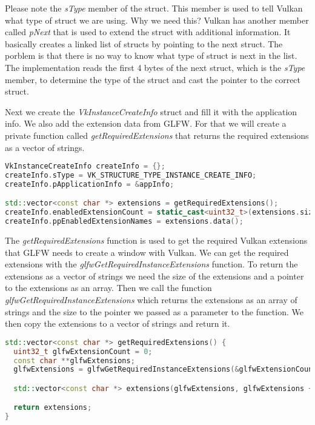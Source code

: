 \documentclass[12pt]{report} \usepackage{preamble}
\begin{document}
Please note the \textit{sType} member of the struct. This member is used to tell Vulkan
what type of struct we are using. Why we need this? Vulkan has another member called
\textit{pNext} that is used to extend the struct with additional information. It basically
creates a linked list of structs by pointing to the next struct. The porblem is that there is
no way to know what type of struct is next in the list. The implementation reads the first 4 bytes
of the next struct, which is the \textit{sType} member, to determine the type of the struct and
cast the pointer to the correct struct.

Next we create the \textit{VkInstanceCreateInfo} struct and fill it with the application info.
We also add the extension data from GLFW.
For that we will create a private function called \textit{getRequiredExtensions} that returns
the required extensions as a vector of strings.

\begin{lstlisting}[language=C++]
VkInstanceCreateInfo createInfo = {};
createInfo.sType = VK_STRUCTURE_TYPE_INSTANCE_CREATE_INFO;
createInfo.pApplicationInfo = &appInfo;

std::vector<const char *> extensions = getRequiredExtensions();
createInfo.enabledExtensionCount = static_cast<uint32_t>(extensions.size());
createInfo.ppEnabledExtensionNames = extensions.data();
\end{lstlisting}

The \textit{getRequiredExtensions} function is used to get the required Vulkan extensions
that GLFW needs to create a window with Vulkan. We can get the required extensions with the
\textit{glfwGetRequiredInstanceExtensions} function. To return the extensions as a vector of strings
we need the size of the extensions and a pointer to the extensions as an array. Then we call the function
\textit{glfwGetRequiredInstanceExtensions} which returns the extensions as an array of strings and the size
to the pointer we passed as a parameter to the function. We then copy the extensions to a vector of strings
and return it.

\begin{lstlisting}[language=C++]
std::vector<const char *> getRequiredExtensions() {
  uint32_t glfwExtensionCount = 0;
  const char **glfwExtensions;
  glfwExtensions = glfwGetRequiredInstanceExtensions(&glfwExtensionCount);

  std::vector<const char *> extensions(glfwExtensions, glfwExtensions + glfwExtensionCount);

  return extensions;
}
\end{lstlisting}
\end{document}
